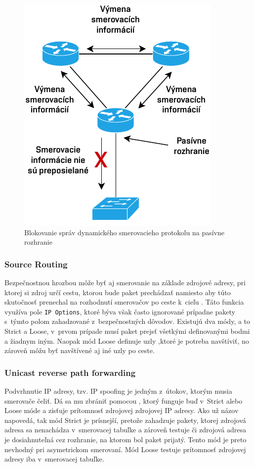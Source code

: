 \begin{figure}[H]
	\begin{center}
		\includegraphics[scale=1]{obrazky/passive-interface.pdf}
	\end{center}
	\caption[Blokovanie správ dynamického smerovacieho protokolu na pasívne rozhranie]{Blokovanie správ dynamického smerovacieho protokolu na pasívne rozhranie}
	\label{fig:passive-int}
\end{figure} 

\subsubsection{Source Routing}
Bezpečnostnou hrozbou môže byť aj smerovanie na základe zdrojové adresy, pri ktorej si zdroj určí cestu, ktorou bude paket prechádzať namiesto aby túto skutočnosť prenechal na rozhodnutí smerovačov po ceste k~cieľu \cite{CIS_DrTLsgXv24lxeIIM}. Táto funkcia využíva pole \texttt{IP Options}, ktoré býva však často ignorované prípadne pakety s~týmto polom zahadzované z~bezpečnostných dôvodov. Existujú dva módy, a to Strict a Loose, v~prvom prípade musí paket prejsť všetkými definovanými bodmi a žiadnym iným. Naopak mód Loose definuje uzly ,ktoré je potreba navštíviť, no zároveň môžu byť navštívené aj iné uzly po ceste.  

\subsubsection{Unicast reverse path forwarding}
Podvrhnutie IP adresy, tzv. IP spoofing je jedným z~útokov, ktorým musia smerovače čeliť. Dá sa mu zbrániť pomocou  \cite{Jackson2010}, ktorý funguje buď v~Strict alebo Loose móde a zisťuje prítomnosť zdrojovej zdrojovej IP adresy. Ako už názov napovedá, tak mód Strict je prísnejší, pretože zahadzuje pakety, ktorej zdrojová adresa sa nenachádza v~smerovacej tabuľke a zároveň testuje či zdrojová adresa je dosiahnuteľná cez rozhranie, na ktorom bol paket prijatý. Tento mód je preto nevhodný pri asymetrickom smerovaní. Mód Loose testuje prítomnosť zdrojovej adresy iba v~smerovacej tabuľke. 

